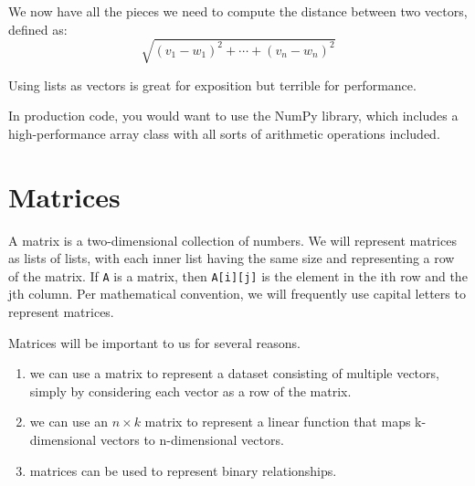 We now have all the pieces we need to compute the distance between two
vectors, defined as:
\begin{equation*}
    \sqrt{(v_1-w_1)^2+\cdots+(v_n-w_n)^2}
\end{equation*}

\begin{tcolorbox}
    Using lists as vectors is great for exposition but terrible for performance.

    In production code, you would want to use the NumPy library, which includes a high-performance array class with all sorts of arithmetic operations included.
\end{tcolorbox}

\section{Matrices}
A matrix is a two-dimensional collection of numbers. We will represent
matrices as lists of lists, with each inner list having the same size and
representing a row of the matrix. If \verb|A| is a matrix, then \verb|A[i][j]| is the
element in the ith row and the jth column. Per mathematical convention, we
will frequently use capital letters to represent matrices.

Matrices will be important to us for several reasons.
\begin{enumerate}
    \item we can use a matrix to represent a dataset consisting of multiple
          vectors, simply by considering each vector as a row of the matrix.
    \item we can use an $n \times k$ matrix to represent a linear
          function that maps k-dimensional vectors to n-dimensional vectors.
    \item matrices can be used to represent binary relationships.
\end{enumerate}
